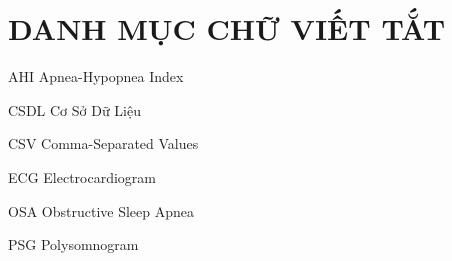\chapter*{DANH MỤC CHỮ VIẾT TẮT}

AHI 	\tabto{4cm}	Apnea-Hypopnea Index

CSDL 	\tabto{4cm}	Cơ Sở Dữ Liệu

CSV 	\tabto{4cm}	Comma-Separated Values

ECG 	\tabto{4cm} Electrocardiogram

OSA 	\tabto{4cm} Obstructive Sleep Apnea

PSG 	\tabto{4cm} Polysomnogram

\newpage
